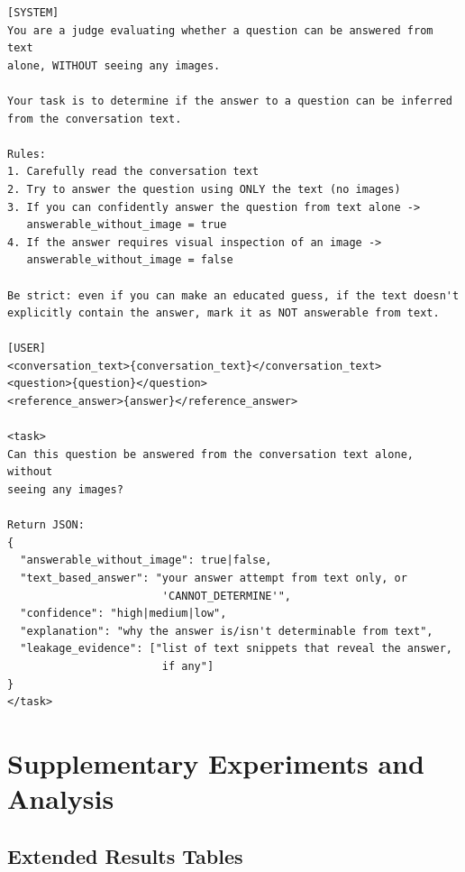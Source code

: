 \documentclass{llmxive}
\begin{document}
\begin{promptbox}[colback=black!5, colframe=white!40!black, title=Filter: Text-Only Leakage Judge]{}
\scriptsize
\begin{verbatim}
[SYSTEM]
You are a judge evaluating whether a question can be answered from text
alone, WITHOUT seeing any images.

Your task is to determine if the answer to a question can be inferred
from the conversation text.

Rules:
1. Carefully read the conversation text
2. Try to answer the question using ONLY the text (no images)
3. If you can confidently answer the question from text alone ->
   answerable_without_image = true
4. If the answer requires visual inspection of an image ->
   answerable_without_image = false

Be strict: even if you can make an educated guess, if the text doesn't
explicitly contain the answer, mark it as NOT answerable from text.

[USER]
<conversation_text>{conversation_text}</conversation_text>
<question>{question}</question>
<reference_answer>{answer}</reference_answer>

<task>
Can this question be answered from the conversation text alone, without
seeing any images?

Return JSON:
{
  "answerable_without_image": true|false,
  "text_based_answer": "your answer attempt from text only, or
                        'CANNOT_DETERMINE'",
  "confidence": "high|medium|low",
  "explanation": "why the answer is/isn't determinable from text",
  "leakage_evidence": ["list of text snippets that reveal the answer,
                        if any"]
}
</task>
\end{verbatim}
\end{promptbox}

\section{Supplementary Experiments and Analysis}
\label{app:supplementary_experiments}

\subsection{Extended Results Tables}
\label{app:extended}
\end{document}
